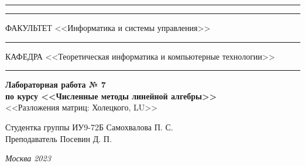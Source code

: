 \documentclass[a4paper, 14pt]{extarticle}
\begin{document}
\begin{titlepage}
\vspace{-25pt}
\hspace{-35pt}\rule{\textwidth}{2.3pt}

\vspace*{-20.3pt}
\hspace{-35pt}\rule{\textwidth}{0.4pt}

\vspace{1.5ex}
\hspace{-35pt} \noindent \small ФАКУЛЬТЕТ\hspace{80pt} <<Информатика и системы управления>>

\vspace*{-16pt}
\hspace{47pt}\rule{0.83\textwidth}{0.4pt}

\vspace{0.5ex}
\hspace{-35pt} \noindent \small КАФЕДРА\hspace{50pt} <<Теоретическая информатика и компьютерные технологии>>

\vspace*{-16pt}
\hspace{30pt}\rule{0.866\textwidth}{0.4pt}
  
\vspace{11em}

\begin{center}
\Large {\bf Лабораторная работа № 7} \\
\large {\bf по курсу <<Численные методы линейной алгебры>>} \\
\large <<Разложения матриц: Холецкого, LU>>
\end{center}\normalsize

\vspace{8em}


\begin{flushright}
  {Студентка группы ИУ9-72Б Самохвалова П. С. \hspace*{15pt}\\
  \vspace{2ex}
  Преподаватель Посевин Д. П.\hspace*{15pt}}
\end{flushright}

\bigskip

\vfill
 

\begin{center}
\textsl{Москва 2023}
\end{center}
\end{titlepage}
\end{document}
